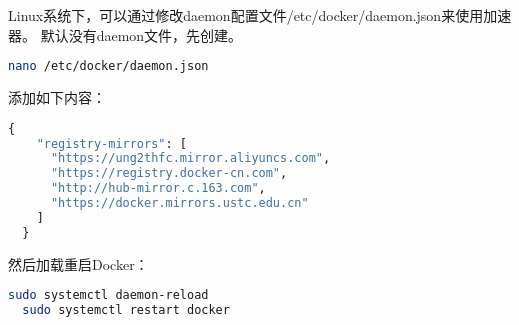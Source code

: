 \documentclass[lang=cn,a4paper,newtx]{elegantpaper}
\begin{document}
Linux系统下，可以通过修改daemon配置文件/etc/docker/daemon.json来使用加速器。
默认没有daemon文件，先创建。
\begin{lstlisting}[language=bash]
nano /etc/docker/daemon.json
\end{lstlisting}

添加如下内容：
\begin{lstlisting}[language=python]
  {
    "registry-mirrors": [
      "https://ung2thfc.mirror.aliyuncs.com",
      "https://registry.docker-cn.com",
      "http://hub-mirror.c.163.com",
      "https://docker.mirrors.ustc.edu.cn"
    ]
  }
\end{lstlisting}

然后加载重启Docker：
\begin{lstlisting}[language=bash]
  sudo systemctl daemon-reload
  sudo systemctl restart docker
\end{lstlisting}
\end{document}
